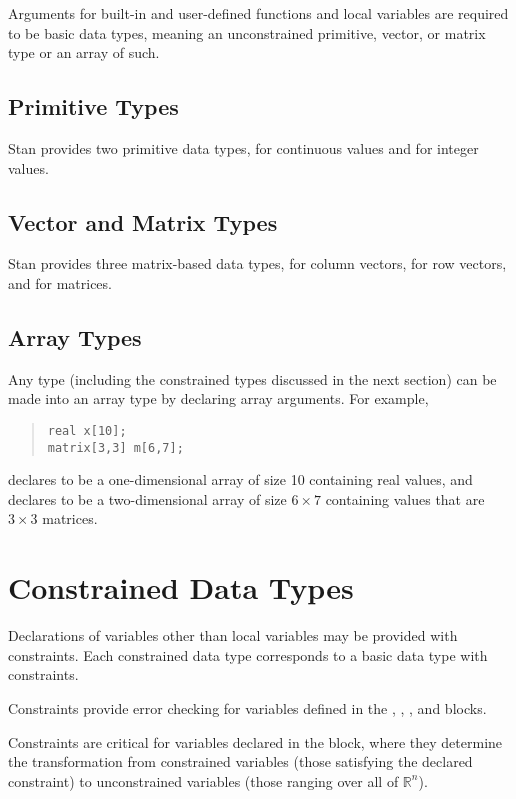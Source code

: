 Arguments for built-in and user-defined functions and local variables
are required to be basic data types, meaning an unconstrained
primitive, vector, or matrix type or an array of such.

\subsection{Primitive Types}

Stan provides two primitive data types,  for continuous
values and  for integer values.

\subsection{Vector and Matrix Types}
Stan provides three matrix-based data types,  for column
vectors,  for row vectors, and  for
matrices.

\subsection{Array Types}

Any type (including the constrained types discussed in the next
section) can be made into an array type by declaring array arguments.
For example,
%
\begin{quote}
\begin{Verbatim}
real x[10];
matrix[3,3] m[6,7];
\end{Verbatim}
\end{quote}
%
declares  to be a one-dimensional array of size 10 containing
real values, and declares  to be a two-dimensional array of
size $6 \times 7$ containing values that are $3 \times 3$ matrices.


\section{Constrained Data Types}

Declarations of variables other than local variables may be provided
with constraints.  Each constrained data type corresponds to a basic
data type with constraints.

Constraints provide error checking for variables defined in the ,
, , and 
 blocks.

Constraints are critical for variables declared in the
 block, where they determine the transformation from
constrained variables (those satisfying the declared constraint) to
unconstrained variables (those ranging over all of $\mathbb{R}^n$).

